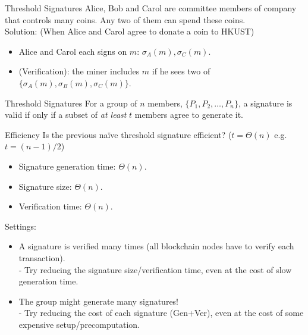     \begin{frame}{Threshold Signatures}
    Alice, Bob and Carol are committee members of company that controls many coins. {\color{red} Any two of them} can spend these coins. \\ \pause 
    Solution: (When Alice and Carol agree to donate a coin to HKUST) 
    \begin{itemize}
        \item Alice and Carol each signs on $m$: $\sigma_A(m), \sigma_C(m)$. 
        \item (Verification): the miner includes $m$ if he sees two of $\{\sigma_A(m),\sigma_B(m), \sigma_C(m)\}$. 
    \end{itemize}
    \begin{block}{Threshold Signatures} 
        For a group of $n$ members, $\{P_1, P_2,\dots, P_n\}$, a signature is valid if only if a subset of \textit{at least} $t$ members agree to generate it.  
    \end{block}
    \end{frame}



\begin{frame}{Efficiency}
    Is the previous na\"ive threshold signature efficient? ($t=\Theta(n)$ e.g. $t=(n-1)/2$)\\
    \begin{itemize}
        \item Signature generation time: $\Theta(n)$. 
        \item Signature size: $\Theta(n)$. 
        \item Verification time: $\Theta(n)$. 
    \end{itemize}
    \pause 
    
    Settings: 
    \begin{itemize}
    \item  A signature is verified many times (all blockchain nodes have to verify each transaction). \\
    - Try reducing the signature size/verification time, even at the cost of slow generation time. \pause 
    \item The group might generate many signatures! \\
    - Try reducing the cost of each signature (Gen+Ver), even at the cost of some expensive setup/precomputation. 
    \end{itemize}
    \end{frame}
    